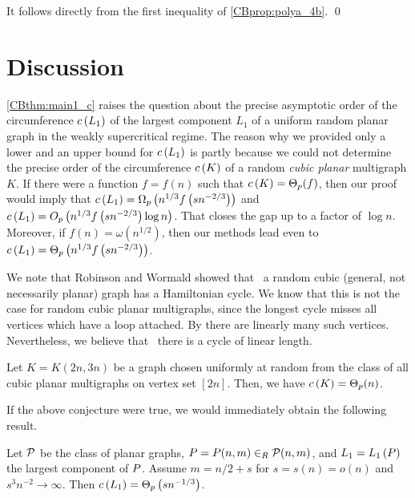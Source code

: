 It follows directly from the first inequality of \ref{CBprop:polya_4b}.
\qed
 

\section{Discussion}\label{CBsec:discussion}
\ref{CBthm:main1_c} raises the question about the precise asymptotic order of the circumference $c\left({L_1}\right)$ of the largest component $L_1$ of a uniform random planar graph in the weakly supercritical regime. The reason why we provided only a lower and an upper bound for $c\left({L_1}\right)$ is partly because we could not determine the precise order of the circumference $c\left({K}\right)$ of a random {\em cubic planar} multigraph $K$. If there were a function $f=f(n)$ such that $c\left({K}\right)=\Theta_p(f)$, then our proof would imply that $c\left({L_1}\right)=\Omega_p\left(n^{1/3}f\left(sn^{-2/3}\right)\right)$ and $c\left({L_1}\right)=O_p\left(n^{1/3}f\left(sn^{-2/3}\right)\log n\right)$. That closes the gap up to a factor of $\log n$. Moreover, if $f(n)=\omega\left(n^{1/2}\right)$, then our methods lead even to $c\left({L_1}\right)=\Theta_p\left(n^{1/3}f\left(sn^{-2/3}\right)\right)$. 

We note that Robinson and Wormald \cite{RobinsonWormald1992} showed that \whp\ a random cubic (general, not necessarily planar) graph has a Hamiltonian cycle. We know that this is not the case for random cubic planar multigraphs, since the longest cycle misses all vertices which have a loop attached. By  there are linearly many such vertices. Nevertheless, we believe that \whp\ there is a cycle of linear length.
\begin{conjecture}
Let $K=K(2n,3n)$ be a graph chosen uniformly at random from the class of all cubic planar multigraphs on vertex set $[2n]$. Then, we have $c\left({K}\right)=\Theta_p(n)$.
\end{conjecture}
If the above conjecture were true, we would immediately obtain the following result.
\begin{conjecture}
Let $\mathcal {P}$ be the class of planar graphs, $P=P(n,m) \in_R \mathcal {P}(n,m)$, and $L_1=L_1\left(P\right)$ the largest component of $P$. Assume $m=n/2+s$ for $s=s(n)=o\left(n\right)$ and $s^3n^{-2} \to \infty$. Then $c\left({L_1}\right)=\Theta_p\left(sn^{-1/3}\right)$.
\end{conjecture}

